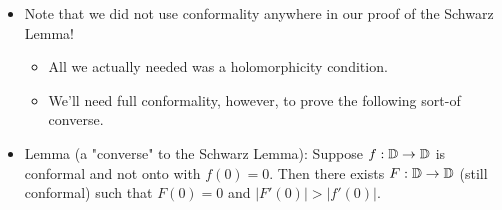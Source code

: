 \documentclass[../notes.tex]{subfiles}
\begin{document}
\begin{itemize}
\begin{enumerate}
\begin{proof}
            Let $c$ be this constant value. Naturally, it follows that in particular, $c=f(z_0)/z_0$ and hence
            \begin{equation*}
                |c| = \left| \frac{f(z_0)}{z_0} \right| = 1
            \end{equation*}
            But via algebraic rearrangement this means that $f(z)=cz$ where $c\in\C$ has $|c|=1$. Therefore, $f$ is a rotation, as desired.
        \end{proof}
        \item If $|f'(0)|=1$, then $f$ is a rotation.
        \begin{proof}

            In the proof of part (1), we showed that the power series expansion of $f(z)/z$ is
            \begin{equation*}
                \frac{f(z)}{z} = a_1+a_2z+\cdots
                = f'(0)+\frac{f''(0)}{2!}z+\cdots
            \end{equation*}
            Thus, since $|f'(0)|=1$, we have that
            \begin{equation*}
                \left| \widehat{\frac{f(0)}{0}} \right| = \left| f'(0)+\frac{f''(0)}{2!}\cdot 0+\cdots \right|
                = |f'(0)|
                = 1
            \end{equation*}
            Thus, as in the proof of part (2), we have shown that there exists a point in $\D$ at which $|f(z)/z|=1$. Therefore, $f$ is a rotation by a symmetric argument, as desired.
        \end{proof}
    \end{enumerate}
    \item Note that we did not use conformality anywhere in our proof of the Schwarz Lemma!
    \begin{itemize}
        \item All we actually needed was a holomorphicity condition.
        \item We'll need full conformality, however, to prove the following sort-of converse.
    \end{itemize}
    \item Lemma (a "converse" to the Schwarz Lemma): Suppose $f:\mathbb{D}\to\mathbb{D}$ is conformal and not onto with $f(0)=0$. Then there exists $F:\mathbb{D}\to\mathbb{D}$ (still conformal) such that $F(0)=0$ and $|F'(0)|>|f'(0)|$.
    \begin{figure}[H]
        \centering
\end{figure}
\end{itemize}
\end{document}
